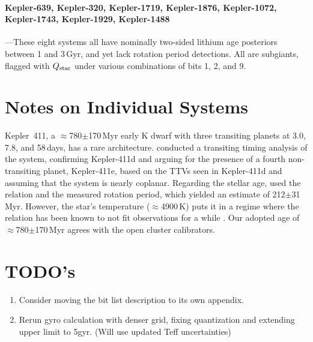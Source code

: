 \documentclass[11pt,twocolumn,tighten]{aastex63}
\begin{document}
\paragraph{Kepler-639, Kepler-320, Kepler-1719, Kepler-1876,
Kepler-1072, Kepler-1743, Kepler-1929, Kepler-1488}---These eight
systems all have nominally two-sided lithium age posteriors between 1
and 3\,Gyr, and yet lack rotation period detections.  All are
subgiants, flagged with $Q_{\rm star}$ under various combinations of
bits 1, 2, and 9.


\section{Notes on Individual Systems}

%

Kepler~411, a $\approx$780$\pm$170\,Myr early K dwarf with three
transiting planets at 3.0, 7.8, and 58\,days, has a rare
architecture.  \citet{2019A&A...624A..15S} conducted a transiting
timing analysis of the system, confirming Kepler-411d and arguing for
the presence of a fourth non-transiting planet, Kepler-411e, based on
the TTVs seen in Kepler-411d and assuming that the system is nearly
coplanar.  Regarding the stellar age, \citet{2019A&A...624A..15S} used
the \citet{2007ApJ...669.1167B} relation and the measured rotation
period, which yielded an estimate of 212$\pm$31\,Myr.  However, the
star's temperature ($\approx$4900\,K) puts it in a regime where the
\citeauthor{2007ApJ...669.1167B} relation has been known to not fit
observations for a while
\citep[e.g.][Fig.~9]{Mamajek_2008}.  Our adopted age of
$\approx$780$\pm$170\,Myr agrees with the open cluster calibrators.

\section{TODO's}

\begin{enumerate}
  \item Consider moving the bit list description to its own appendix.
  \item Rerun gyro calculation with denser grid, fixing quantization
    and extending upper limit to 5gyr.  (Will use updated Teff
    uncertainties)
\end{enumerate}
\end{document}
